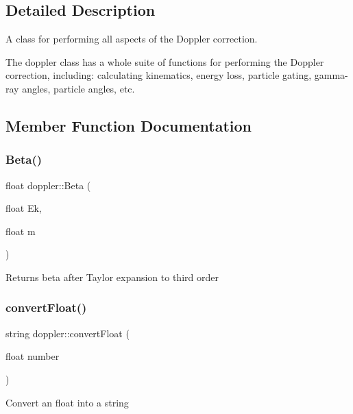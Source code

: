 \subsection{Detailed Description}
A class for performing all aspects of the Doppler correction. 

The doppler class has a whole suite of functions for performing the Doppler correction, including\+: calculating kinematics, energy loss, particle gating, gamma-\/ray angles, particle angles, etc. 

\subsection{Member Function Documentation}
\mbox{\label{classdoppler_a28eb084d224fdb58fda1d6f6c61dd232}} 
\subsubsection{\texorpdfstring{Beta()}{Beta()}}
{\footnotesize\ttfamily float doppler\+::\+Beta (\begin{DoxyParamCaption}\item[{float}]{Ek,  }\item[{float}]{m }\end{DoxyParamCaption})}

Returns beta after Taylor expansion to third order \mbox{\label{classdoppler_a0fa8eec8989c81e59ecfb8e09140020c}} 
\subsubsection{\texorpdfstring{convert\+Float()}{convertFloat()}}
{\footnotesize\ttfamily string doppler\+::convert\+Float (\begin{DoxyParamCaption}\item[{float}]{number }\end{DoxyParamCaption})\hspace{0.3cm}{\ttfamily [static]}}

Convert an float into a string \mbox{\label{classdoppler_a100e363bf80b5371baebb89bbf60b824}} 
